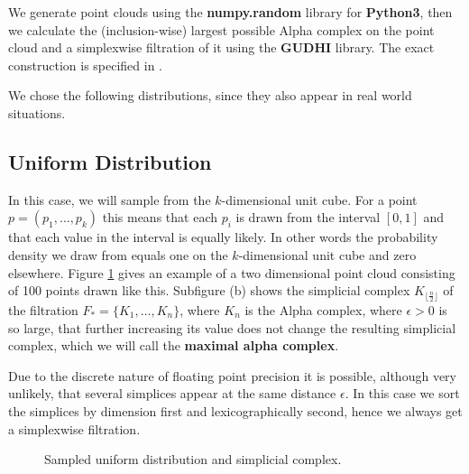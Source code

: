 We generate point clouds using the \textbf{numpy.random} library for \textbf{Python3}, then we calculate the (inclusion-wise) largest possible Alpha complex on the point cloud and a simplexwise filtration of it using the \textbf{GUDHI} library. The exact construction is specified in \cite{gudhi_alpha}.

We chose the following distributions, since they also appear in real world situations. 

\subsection{Uniform Distribution}
In this case, we will sample from the $k$-dimensional unit cube.
For a point $p = (p_1, \dots, p_k)$ this means that each $p_i$ is drawn from the interval $[0,1]$ and that each value in the interval is equally likely. In other words the probability density we draw from equals one on the $k$-dimensional unit cube and zero elsewhere. Figure \ref{fig:uniform} gives an example of a two dimensional point cloud consisting of 100 points drawn like this. Subfigure (b) shows the simplicial complex $K_{\lfloor \frac{n}{2}\rfloor}$ of the filtration $F_* = \{K_1,\dots,K_n\}$, where $K_n$ is the Alpha complex, where $\epsilon > 0$ is so large, that further increasing its value does not change the resulting simplicial complex, which we will call the \textbf{maximal alpha complex}. 

Due to the discrete nature of floating point precision it is possible, although very unlikely, that several simplices appear at the same distance $\epsilon$. In this case we sort the simplices by dimension first and lexicographically second, hence we always get a simplexwise filtration.

\begin{figure}[H]
\begin{subfigure}[t]{0.49\textwidth}
\begin{center}

\end{center}
\end{subfigure}
\begin{subfigure}[t]{0.49\textwidth}
\begin{center}

\end{center}
\end{subfigure}
\caption{Sampled uniform distribution and simplicial complex.}
\label{fig:uniform}
\end{figure}

